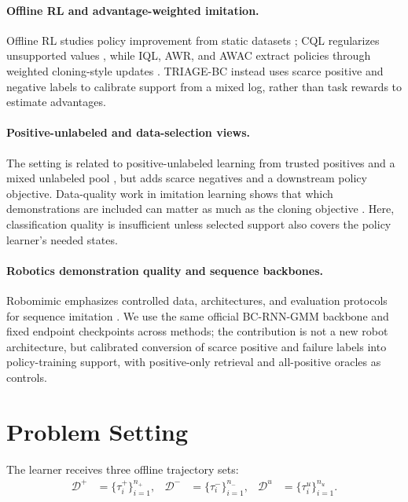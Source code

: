 \documentclass{article}
\newcommand{\Dpos}{\mathcal{D}^{+}}
\newcommand{\Dneg}{\mathcal{D}^{-}}
\newcommand{\Dunl}{\mathcal{D}^{u}}
\newcommand{\method}{TRIAGE-BC}
\begin{document}
\paragraph{Offline RL and advantage-weighted imitation.}
Offline RL studies policy improvement from static datasets \cite{fu2020d4rl}; CQL regularizes unsupported values \cite{kumar2020cql}, while IQL, AWR, and AWAC extract policies through weighted cloning-style updates \cite{kostrikov2022iql,peng2019awr,nair2020awac}. \method{} instead uses scarce positive and negative labels to calibrate support from a mixed log, rather than task rewards to estimate advantages.

\paragraph{Positive-unlabeled and data-selection views.}
The setting is related to positive-unlabeled learning from trusted positives and a mixed unlabeled pool \cite{elkan2008positive}, but adds scarce negatives and a downstream policy objective. Data-quality work in imitation learning shows that which demonstrations are included can matter as much as the cloning objective \cite{belkhale2023dataquality}. Here, classification quality is insufficient unless selected support also covers the policy learner's needed states.

\paragraph{Robotics demonstration quality and sequence backbones.}
Robomimic emphasizes controlled data, architectures, and evaluation protocols for sequence imitation \cite{mandlekar2021robomimic}. We use the same official BC-RNN-GMM backbone and fixed endpoint checkpoints across methods; the contribution is not a new robot architecture, but calibrated conversion of scarce positive and failure labels into policy-training support, with positive-only retrieval and all-positive oracles as controls.

\section{Problem Setting}

The learner receives three offline trajectory sets:
\begin{align}
  \Dpos &= \{\tau_i^+\}_{i=1}^{n_+}, &
  \Dneg &= \{\tau_i^-\}_{i=1}^{n_-}, &
  \Dunl &= \{\tau_i^u\}_{i=1}^{n_u}.
\end{align}
\end{document}
